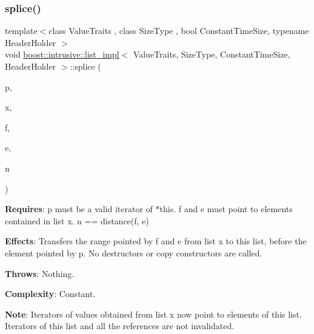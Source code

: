 \subsubsection{\texorpdfstring{splice()}{splice()}\hspace{0.1cm}{\footnotesize\ttfamily [4/4]}}
{\footnotesize\ttfamily template$<$class Value\+Traits , class Size\+Type , bool Constant\+Time\+Size, typename Header\+Holder $>$ \\
void \hyperlink{classboost_1_1intrusive_1_1list__impl}{boost\+::intrusive\+::list\+\_\+impl}$<$ Value\+Traits, Size\+Type, Constant\+Time\+Size, Header\+Holder $>$\+::splice (\begin{DoxyParamCaption}\item[{\hyperlink{classboost_1_1intrusive_1_1list__impl_af4ced710fe02662c5650d161af83d8cd}{const\+\_\+iterator}}]{p,  }\item[{\hyperlink{classboost_1_1intrusive_1_1list__impl}{list\+\_\+impl}$<$ Value\+Traits, Size\+Type, Constant\+Time\+Size, Header\+Holder $>$ \&}]{x,  }\item[{\hyperlink{classboost_1_1intrusive_1_1list__impl_af4ced710fe02662c5650d161af83d8cd}{const\+\_\+iterator}}]{f,  }\item[{\hyperlink{classboost_1_1intrusive_1_1list__impl_af4ced710fe02662c5650d161af83d8cd}{const\+\_\+iterator}}]{e,  }\item[{\hyperlink{classboost_1_1intrusive_1_1list__impl_a3e340b93081e392fba09de7145fb5733}{size\+\_\+type}}]{n }\end{DoxyParamCaption})\hspace{0.3cm}{\ttfamily [inline]}}

{\bfseries Requires}\+: p must be a valid iterator of $\ast$this. f and e must point to elements contained in list x. n == distance(f, e)

{\bfseries Effects}\+: Transfers the range pointed by f and e from list x to this list, before the element pointed by p. No destructors or copy constructors are called.

{\bfseries Throws}\+: Nothing.

{\bfseries Complexity}\+: Constant.

{\bfseries Note}\+: Iterators of values obtained from list x now point to elements of this list. Iterators of this list and all the references are not invalidated. \mbox{\label{classboost_1_1intrusive_1_1list__impl_a08187766526ac474bc92fe5103fb8f7b}} 
